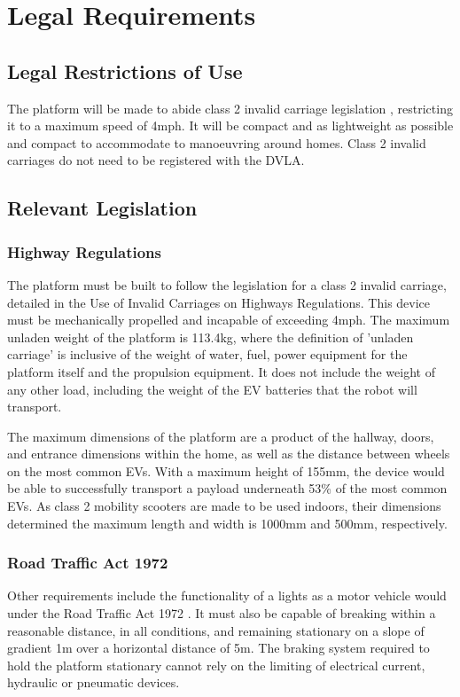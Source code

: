 \documentclass [12pt]{article}
\begin{document}
\section{Legal Requirements}
\subsection{Legal Restrictions of Use}
The platform will be made to abide class 2 invalid carriage legislation \cite{Invalid_Legislation}, restricting it to a maximum speed of 4mph. It will be compact and as lightweight as possible and compact to accommodate to manoeuvring around homes. Class 2 invalid carriages do not need to be registered with the DVLA.

\subsection{Relevant Legislation}
\subsubsection{Highway Regulations}
The platform must be built to follow the legislation for a class 2 invalid carriage, detailed in the Use of Invalid Carriages \cite{Invalid_Legislation} on Highways Regulations. This device must be mechanically propelled and incapable of exceeding 4mph. The maximum unladen weight of the platform is 113.4kg, where the definition of 'unladen carriage' is inclusive of the weight of water, fuel, power equipment for the platform itself and the propulsion equipment. It does not include the weight of any other load, including the weight of the EV batteries that the robot will transport.

The maximum dimensions of the platform are a product of the hallway, doors, and entrance dimensions within the home, as well as the distance between wheels on the most common EVs. With a maximum height of 155mm, the device would be able to successfully transport a payload underneath 53\% of the most common EVs. As class 2 mobility scooters are made to be used indoors, their dimensions determined the maximum length and width is 1000mm and 500mm, respectively.

\subsubsection{Road Traffic Act 1972}
Other requirements include the functionality of a lights as a motor vehicle would under the Road Traffic Act 1972 \cite{Road_Traffic}. It must also be capable of breaking within a reasonable distance, in all conditions, and remaining stationary on a slope of gradient 1m over a horizontal distance of 5m. The braking system required to hold the platform stationary cannot rely on the limiting of electrical current, hydraulic or pneumatic devices.
\end{document}

